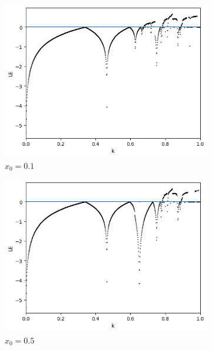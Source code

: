 \begin{figure}[h!]
	\centering
	\begin{subfigure}[b]{0.45\textwidth}
		\centering
		\includegraphics[width=\textwidth]{LateX images/graphs q16/g7}
		\caption{\(x_0=0.1\)}
		\label{f:g33}
	\end{subfigure}
	\hfill
	\begin{subfigure}[b]{0.45\textwidth}
		\centering
		\includegraphics[width=\textwidth]{LateX images/graphs q16/g8}
		\caption{\(x_0=0.5\)}
		\label{f:g34}
	\end{subfigure}
	\hfill
	\begin{subfigure}[b]{0.45\textwidth}
		\centering

\end{subfigure}
\end{figure}
